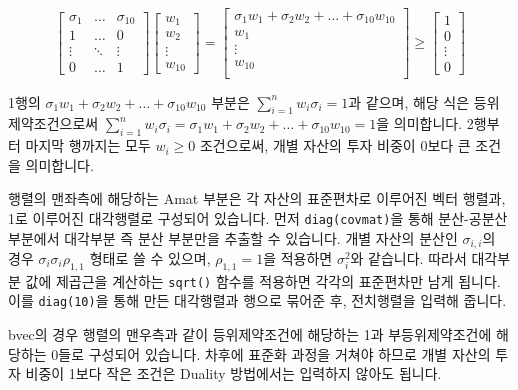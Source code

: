 \documentclass[12pt,]{book}
\newenvironment{Shaded}{\begin{snugshade}}{\end{snugshade}}
\newcommand{\DecValTok}[1]{\textcolor[rgb]{0.00,0.00,0.81}{#1}}
\newcommand{\KeywordTok}[1]{\textcolor[rgb]{0.13,0.29,0.53}{\textbf{#1}}}
\newcommand{\NormalTok}[1]{#1}
\newcommand{\OperatorTok}[1]{\textcolor[rgb]{0.81,0.36,0.00}{\textbf{#1}}}
\newcommand{\StringTok}[1]{\textcolor[rgb]{0.31,0.60,0.02}{#1}}
\begin{document}
\[ \begin{bmatrix}
\sigma_1 & \dots & \sigma_{10} \\ 1 & \dots & 0 \\ \vdots & \ddots & \vdots \\
0 & \dots & 1 \end{bmatrix}
\begin{bmatrix} w_1 \\ w_2 \\ \vdots \\ w_{10} \end{bmatrix} = 
\begin{bmatrix} \sigma_1w_1 + \sigma_2w_2 + \dots + \sigma_{10}w_{10} \\ w_1 \\ \vdots \\ w_{10} \\ \end{bmatrix} \ge \begin{bmatrix} 1 \\ 0 \\ \vdots \\ 0 \end{bmatrix} \]

1행의 \(\sigma_1w_1 + \sigma_2w_2 + \dots + \sigma_{10}w_{10}\) 부분은 \(\sum_{i=1}^n w_i \sigma_i = 1\)과 같으며, 해당 식은 등위제약조건으로써 \(\sum_{i=1}^n w_i \sigma_i = \sigma_1w_1 + \sigma_2w_2 + \dots + \sigma_{10}w_{10} = 1\)을 의미합니다. 2행부터 마지막 행까지는 모두 \(w_i \ge 0\) 조건으로써, 개별 자산의 투자 비중이 0보다 큰 조건을 의미합니다.

행렬의 맨좌측에 해당하는 Amat 부분은 각 자산의 표준편차로 이루어진 벡터 행렬과, 1로 이루어진 대각행렬로 구성되어 있습니다. 먼저 \texttt{diag(covmat)}을 통해 분산-공분산 부분에서 대각부분 즉 분산 부분만을 추출할 수 있습니다. 개별 자산의 분산인 \(\sigma_{i,i}\)의 경우 \(\sigma_i\sigma_i\rho_{1,1}\) 형태로 쓸 수 있으며, \(\rho_{1,1} = 1\)을 적용하면 \(\sigma_i^2\)와 같습니다. 따라서 대각부분 값에 제곱근을 계산하는 \texttt{sqrt()} 함수를 적용하면 각각의 표준편차만 남게 됩니다. 이를 \texttt{diag(10)}을 통해 만든 대각행렬과 행으로 묶어준 후, 전치행렬을 입력해 줍니다.

bvec의 경우 행렬의 맨우측과 같이 등위제약조건에 해당하는 1과 부등위제약조건에 해당하는 0들로 구성되어 있습니다. 차후에 표준화 과정을 거쳐야 하므로 개별 자산의 투자 비중이 1보다 작은 조건은 Duality 방법에서는 입력하지 않아도 됩니다.

\begin{Shaded}
\end{Shaded}
\end{document}
